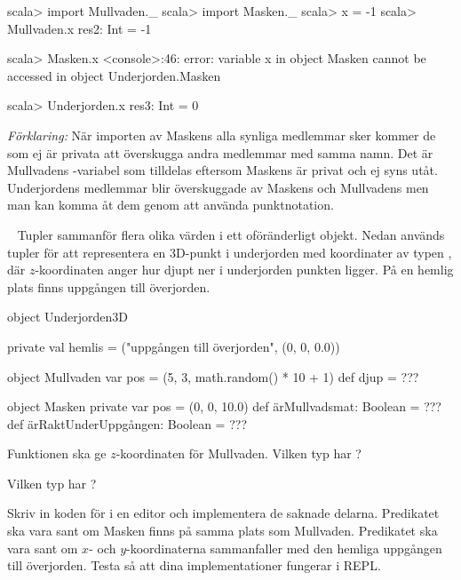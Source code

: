 \SubtaskSolved

\begin{REPL}
scala> import Mullvaden._
scala> import Masken._
scala> x = -1
scala> Mullvaden.x
res2: Int = -1

scala> Masken.x
<console>:46: error:
  variable x in object Masken cannot be accessed
  in object Underjorden.Masken

scala> Underjorden.x
res3: Int = 0
\end{REPL}

\noindent \emph{Förklaring:} När importen av Maskens alla synliga medlemmar sker kommer de som ej är privata att överskugga andra medlemmar med samma namn. Det är Mullvadens -variabel som tilldelas  eftersom Maskens  är privat och ej syns utåt. Underjordens medlemmar blir överskuggade av Maskens  och Mullvadens  men man kan komma åt dem genom att använda punktnotation.

\QUESTEND





\QUESTBEGIN

\Task \what~ Tupler sammanför flera olika värden i ett oföränderligt objekt. Nedan används tupler för att representera en 3D-punkt i underjorden med koordinater  av typen , där $z$-koordinaten anger hur djupt ner i underjorden punkten ligger. På en hemlig plats finns uppgången till överjorden.

\begin{Code}
object Underjorden3D {
  private val hemlis = ("uppgången till överjorden", (0, 0, 0.0))

  object Mullvaden {
    var pos = (5, 3, math.random() * 10 + 1)
    def djup  = ???
  }

  object Masken {
    private var pos = (0, 0, 10.0)
    def ärMullvadsmat: Boolean = ???
    def ärRaktUnderUppgången: Boolean = ???
  }
}
\end{Code}

\Subtask Funktionen  ska ge $z$-koordinaten för Mullvaden. Vilken typ har ?

\Subtask Vilken typ har ?

\Subtask Skriv in koden för  i en editor och implementera de saknade delarna. Predikatet  ska vara sant om Masken finns på samma plats som Mullvaden. Predikatet   ska vara sant om $x$- och $y$-koordinaterna sammanfaller med den hemliga uppgången till överjorden. Testa så att dina implementationer fungerar i REPL.

